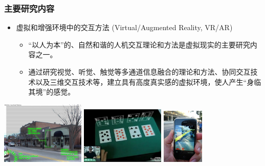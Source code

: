 \documentclass{beamer}
\begin{document}
\begin{frame}
	\frametitle{主要研究内容}
	\begin{itemize}
		\item 虚拟和增强环境中的交互方法 (Virtual/Augmented Reality, VR/AR)
		\begin{itemize}
			\item “以人为本”的、自然和谐的人机交互理论和方法是虚拟现实的主要研究内容之一。
			\item 通过研究视觉、听觉、触觉等多通道信息融合的理论和方法、协同交互技术以及三维交互技术等，建立具有高度真实感的虚拟环境，使人产生“身临其境”的感觉。
		\end{itemize}
	\end{itemize}
	\begin{center}
		\includegraphics[width=4cm]{images/augmented-reality-hud.jpg}
		\includegraphics[width=4cm]{images/marco_tempest_augmented_reality_magic-480x327.jpg}
		\includegraphics[width=2cm]{images/MediatedReality_on_iPhone2009_07_13_21_33_39.jpg}
	\end{center}
\end{frame}
\end{document}
